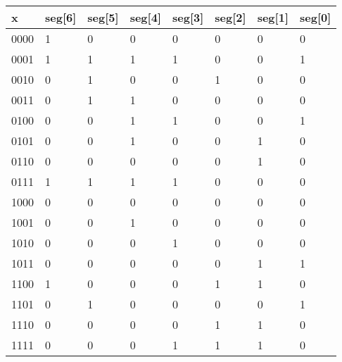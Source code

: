 \begin{enumerate}
\begin{onlysolution}
                    {\color{blue}
                        \begin{tabular}{l|l|l|l|l|l|l|l}
                            x    & seg{[}6{]} & seg{[}5{]} & seg{[}4{]} & seg{[}3{]} & seg{[}2{]} & seg{[}1{]} & seg{[}0{]} \\ \hline
                            0000 & 1          & 0          & 0          & 0          & 0          & 0          & 0          \\ \hline
                            0001 & 1          & 1          & 1          & 1          & 0          & 0          & 1          \\ \hline
                            0010 & 0          & 1          & 0          & 0          & 1          & 0          & 0          \\ \hline
                            0011 & 0          & 1          & 1          & 0          & 0          & 0          & 0          \\ \hline
                            0100 & 0          & 0          & 1          & 1          & 0          & 0          & 1          \\ \hline
                            0101 & 0          & 0          & 1          & 0          & 0          & 1          & 0          \\ \hline
                            0110 & 0          & 0          & 0          & 0          & 0          & 1          & 0          \\ \hline
                            0111 & 1          & 1          & 1          & 1          & 0          & 0          & 0          \\ \hline
                            1000 & 0          & 0          & 0          & 0          & 0          & 0          & 0          \\ \hline
                            1001 & 0          & 0          & 1          & 0          & 0          & 0          & 0          \\ \hline
                            1010 & 0          & 0          & 0          & 1          & 0          & 0          & 0          \\ \hline
                            1011 & 0          & 0          & 0          & 0          & 0          & 1          & 1          \\ \hline
                            1100 & 1          & 0          & 0          & 0          & 1          & 1          & 0          \\ \hline
                            1101 & 0          & 1          & 0          & 0          & 0          & 0          & 1          \\ \hline
                            1110 & 0          & 0          & 0          & 0          & 1          & 1          & 0          \\ \hline
                            1111 & 0          & 0          & 0          & 1          & 1          & 1          & 0
                        \end{tabular}

}
\end{onlysolution}
\end{enumerate}
